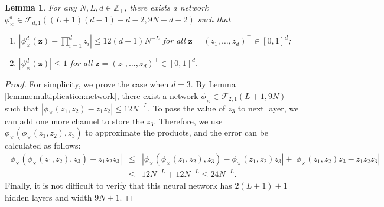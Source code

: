 \documentclass[11pt, preprint]{imsart}
\numberwithin{equation}{section}
\def \mcF{\mathcal{F}}
\def \bfz{\mathbf{z}}
\theoremstyle{plain}
\newtheorem{lemma}{\indent Lemma}
\theoremstyle{definition}
\begin{document}
\begin{lemma}\label{lemma:multiplication:d:approximation}
For any $N, L, d\in \mathbb{Z}_+$, there exists a network $\phi_{\times}^d\in \mcF_{d,1}((L+1)(d-1)+d-2,9N+d-2)$ such that 
\begin{enumerate}
\item $|\phi_{\times}^d(\bfz)-\prod_{i=1}^d z_i|\leq 12(d-1)N^{-L}$ for all $\bfz=(z_1,\ldots, z_d)^\top \in [0, 1]^d$;
\item $|\phi_{\times}^d(\bfz)|\leq 1$ for all $\bfz=(z_1,\ldots, z_d)^\top \in [0, 1]^d$.
\end{enumerate}
\end{lemma}
\begin{proof}
For simplicity, we prove the case when $d=3$. By Lemma \ref{lemma:multiplication:network}, there exist a network $\phi_{\times}\in \mcF_{2,1}(L+1,9N)$ such that $|\phi_{\times}(z_1,z_2)-z_1z_2|\leq 12N^{-L}$. To pass the value of $z_3$ to next layer, we can add one more channel to store the $z_3$. Therefore,  we use $\phi_{\times}(\phi_{\times}(z_1,z_2),z_3)$ to approximate the products, and the error can be calculated as follows:
\begin{eqnarray}
	|\phi_{\times}(\phi_{\times}(z_1,z_2),z_3)-z_1z_2z_3|&\leq& |\phi_{\times}(\phi_{\times}(z_1,z_2),z_3)-\phi_{\times}(z_1,z_2)z_3|+|\phi_{\times}(z_1,z_2)z_3-z_1z_2z_3|\nonumber\\
	&\leq&12N^{-L}+12N^{-L}\leq 24N^{-L}.\nonumber
\end{eqnarray}
Finally, it is not difficult to verify that this neural network has $2(L+1)+1$ hidden layers and width $9N+1$.
\end{proof}
\end{document}
